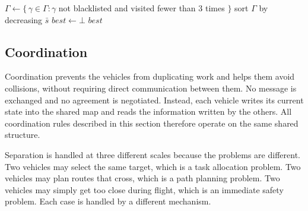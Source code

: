 \begin{algorithm}[!htb]
    \caption{SelectTarget}%
    \label{algo:sys:select}
    $\Gamma \gets \{\, \gamma \in \Gamma : \gamma$ not blacklisted and visited fewer than 3 times $\}$\;
    sort $\Gamma$ by decreasing $\bar{s}$\;
    $\mathit{best} \gets \bot$\;
    \KwRet$\mathit{best}$\;
\end{algorithm}

\FloatBarrier

\subsection{Coordination}%
\label{sec:sys:claims}

Coordination prevents the vehicles from duplicating work and helps them avoid
collisions, without requiring direct communication between them. No message is
exchanged and no agreement is negotiated. Instead, each vehicle writes its
current state into the shared map and reads the information written by the
others. All coordination rules described in this section therefore operate on the
same shared structure.

Separation is handled at three different scales because the problems are
different. Two vehicles may select the same target, which is a task allocation
problem. Two vehicles may plan routes that cross, which is a path planning
problem. Two vehicles may simply get too close during flight, which is an
immediate safety problem. Each case is handled by a different mechanism.

